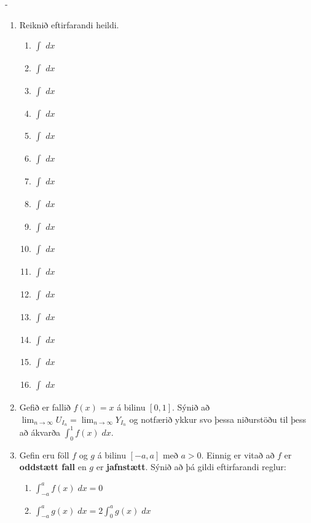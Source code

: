 \begin{adjustwidth}{-\hangingaefingar}{}
\begin{enumerate}
\vspace{2mm}

\item Reiknið eftirfarandi heildi.
\begin{multicols}{2}
\begin{enumerate}
\setlength\itemsep{4mm}
\item $\displaystyle \int_{}^{} \; dx$
\item $\displaystyle \int_{}^{} \; dx$
\item $\displaystyle \int_{}^{} \; dx$
\item $\displaystyle \int_{}^{} \; dx$
\item $\displaystyle \int_{}^{} \; dx$
\item $\displaystyle \int_{}^{} \; dx$
\item $\displaystyle \int_{}^{} \; dx$
\item $\displaystyle \int_{}^{} \; dx$
\item $\displaystyle \int_{}^{} \; dx$
\item $\displaystyle \int_{}^{} \; dx$
\item $\displaystyle \int_{}^{} \; dx$
\item $\displaystyle \int_{}^{} \; dx$
\item $\displaystyle \int_{}^{} \; dx$
\item $\displaystyle \int_{}^{} \; dx$
\item $\displaystyle \int_{}^{} \; dx$
\item $\displaystyle \int_{}^{} \; dx$
\end{enumerate}
\end{multicols}

\vspace{2mm}

\item Gefið er fallið $f(x) = x$ á bilinu $[0,1]$. Sýnið að $\displaystyle \lim_{n \to \infty} U_{I_{n}} = \lim_{n \to \infty} Y_{I_{n}}$ og notfærið ykkur svo þessa niðurstöðu til þess að ákvarða $\displaystyle \int_{0}^{1} f(x) \; dx$.

\vspace{2mm}

\item Gefin eru föll $f$ og $g$ á bilinu $[-a,a]$ með $a > 0$. Einnig er vitað að $f$ er \textbf{oddstætt fall} en $g$ er \textbf{jafnstætt}. Sýnið að þá gildi eftirfarandi reglur:
\begin{enumerate}
\setlength\itemsep{4mm}
\item $\displaystyle \int_{-a}^{a} f(x) \; dx = 0$
\item $\displaystyle \int_{-a}^{a} g(x) \; dx = 2\int_{0}^{a} g(x) \; dx$
\end{enumerate}


\end{enumerate}
\end{adjustwidth}
